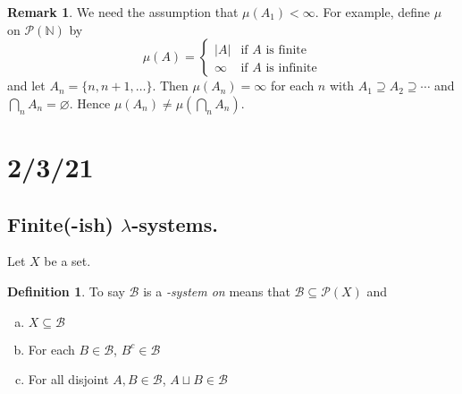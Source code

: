 \documentclass{article}
\newcommand{\N}{\mathbb{N}}
\theoremstyle{definition}
\newtheorem*{definition}{Definition}
\newtheorem*{remark}{Remark}
\begin{document}
\begin{enumerate}[(a)]
    \begin{remark}
        We need the assumption that $\mu(A_1) < \infty$.
        For example, define $\mu$ on $\mathcal{P}(\N)$ by
        \[
            \mu(A) = \begin{cases}
                |A| &\text{if } A \text{ is finite} \\ \infty &\text{if } A \text{ is infinite}
            \end{cases}
        \]
        and let $A_n = \{n, n+1, \dots\}$. Then $\mu(A_n) = \infty$ for each $n$ with $A_1 \supseteq A_2 \supseteq \cdots$ and $\bigcap_n A_n = \varnothing$. Hence $\mu(A_n) \neq \mu(\bigcap_n A_n)$.
    \end{remark}
\end{enumerate}

\section*{2/3/21}
\subsection*{Finite(-ish) $\lambda$-systems.}
Let $X$ be a set.
\begin{definition}
    To say $\mathscr{B}$ is a \emph{-system on}  means that $\mathscr{B} \subseteq \mathcal{P}(X)$ and
    \begin{enumerate}[(a)]
        \item $X \subseteq \mathscr{B}$
        \item For each $B \in \mathscr{B}$, $B^c \in \mathscr{B}$
        \item For all disjoint $A, B \in \mathscr{B}$, $A \sqcup B \in \mathscr{B}$
    \end{enumerate}
\end{definition}
\end{document}
